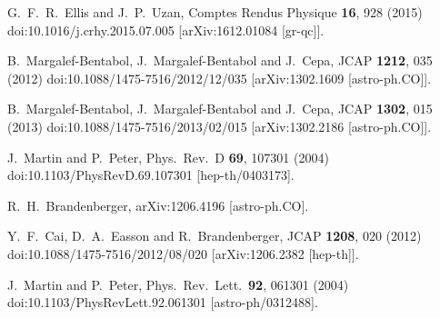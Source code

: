 \documentclass[24pt]{article}
\begin{document}
\begin{thebibliography}{999}
  G.~F.~R.~Ellis and J.~P.~Uzan,
  Comptes Rendus Physique {\bf 16}, 928 (2015)
  doi:10.1016/j.crhy.2015.07.005
  [arXiv:1612.01084 [gr-qc]].
  
  B.~Margalef-Bentabol, J.~Margalef-Bentabol and J.~Cepa,
  JCAP {\bf 1212}, 035 (2012)
  doi:10.1088/1475-7516/2012/12/035
  [arXiv:1302.1609 [astro-ph.CO]].

  B.~Margalef-Bentabol, J.~Margalef-Bentabol and J.~Cepa,
  JCAP {\bf 1302}, 015 (2013)
  doi:10.1088/1475-7516/2013/02/015
  [arXiv:1302.2186 [astro-ph.CO]].
  
  J.~Martin and P.~Peter,
  Phys.\ Rev.\ D {\bf 69}, 107301 (2004)
  doi:10.1103/PhysRevD.69.107301
  [hep-th/0403173].

  R.~H.~Brandenberger,
  arXiv:1206.4196 [astro-ph.CO].

  Y.~F.~Cai, D.~A.~Easson and R.~Brandenberger,
  JCAP {\bf 1208}, 020 (2012)
  doi:10.1088/1475-7516/2012/08/020
  [arXiv:1206.2382 [hep-th]].

  J.~Martin and P.~Peter,
  Phys.\ Rev.\ Lett.\  {\bf 92}, 061301 (2004)
  doi:10.1103/PhysRevLett.92.061301
  [astro-ph/0312488].
  

\end{thebibliography}
\end{document}
